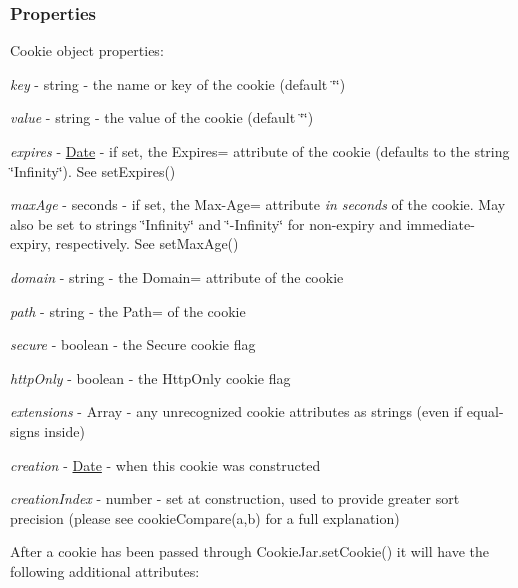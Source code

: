 \subsubsection*{Properties}

Cookie object properties\+:


\begin{DoxyItemize}
\item {\itshape key} -\/ string -\/ the name or key of the cookie (default \char`\"{}\char`\"{})
\item {\itshape value} -\/ string -\/ the value of the cookie (default \char`\"{}\char`\"{})
\item {\itshape expires} -\/ {\ttfamily \mbox{\hyperlink{classDate}{Date}}} -\/ if set, the {\ttfamily Expires=} attribute of the cookie (defaults to the string {\ttfamily \char`\"{}\+Infinity\char`\"{}}). See {\ttfamily set\+Expires()}
\item {\itshape max\+Age} -\/ seconds -\/ if set, the {\ttfamily Max-\/\+Age=} attribute {\itshape in seconds} of the cookie. May also be set to strings {\ttfamily \char`\"{}\+Infinity\char`\"{}} and {\ttfamily \char`\"{}-\/\+Infinity\char`\"{}} for non-\/expiry and immediate-\/expiry, respectively. See {\ttfamily set\+Max\+Age()}
\item {\itshape domain} -\/ string -\/ the {\ttfamily Domain=} attribute of the cookie
\item {\itshape path} -\/ string -\/ the {\ttfamily Path=} of the cookie
\item {\itshape secure} -\/ boolean -\/ the {\ttfamily Secure} cookie flag
\item {\itshape http\+Only} -\/ boolean -\/ the {\ttfamily Http\+Only} cookie flag
\item {\itshape extensions} -\/ {\ttfamily Array} -\/ any unrecognized cookie attributes as strings (even if equal-\/signs inside)
\item {\itshape creation} -\/ {\ttfamily \mbox{\hyperlink{classDate}{Date}}} -\/ when this cookie was constructed
\item {\itshape creation\+Index} -\/ number -\/ set at construction, used to provide greater sort precision (please see {\ttfamily cookie\+Compare(a,b)} for a full explanation)
\end{DoxyItemize}

After a cookie has been passed through {\ttfamily Cookie\+Jar.\+set\+Cookie()} it will have the following additional attributes\+:


